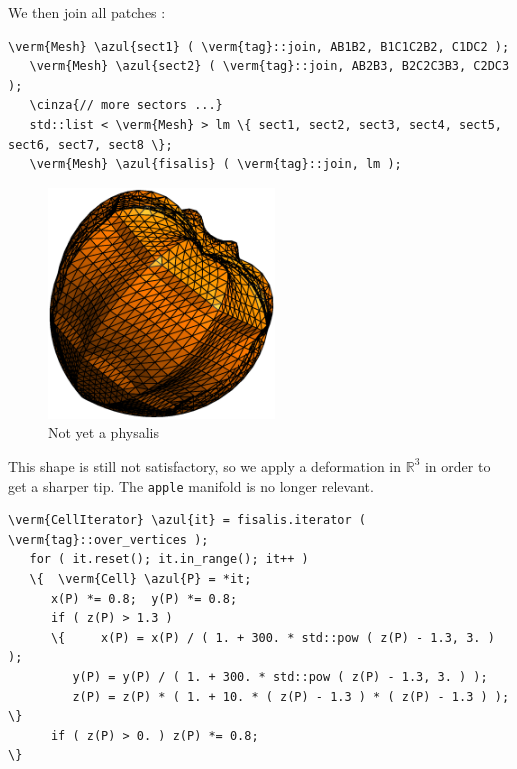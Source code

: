 We then join all patches :
\begin{Verbatim}[commandchars=\\\{\},formatcom=\small\tt,frame=single,
   label=parag-\ref{\numb section 2.\numb parag 10}.cpp,rulecolor=\color{coment},
   baselinestretch=0.94,framesep=2mm]
   \verm{Mesh} \azul{sect1} ( \verm{tag}::join, AB1B2, B1C1C2B2, C1DC2 );
   \verm{Mesh} \azul{sect2} ( \verm{tag}::join, AB2B3, B2C2C3B3, C2DC3 );
   \cinza{// more sectors ...}
   std::list < \verm{Mesh} > lm \{ sect1, sect2, sect3, sect4, sect5, sect6, sect7, sect8 \};
   \verm{Mesh} \azul{fisalis} ( \verm{tag}::join, lm ); 
\end{Verbatim}

\begin{figure}[ht] \centering
  \includegraphics[width=60mm]{fisalis-round}
  \caption{Not yet a physalis}
  \label{\numb section 2.\numb fig 12}
\end{figure}

This shape is still not satisfactory, so we apply a deformation in $ \mathbb{R}^3 $ in order to
get a sharper tip.
The {\small\tt apple} manifold is no longer relevant.

\begin{Verbatim}[commandchars=\\\{\},formatcom=\small\tt,frame=single,
   label=parag-\ref{\numb section 2.\numb parag 10}.cpp,rulecolor=\color{coment},
   baselinestretch=0.94,framesep=2mm]
   \verm{CellIterator} \azul{it} = fisalis.iterator ( \verm{tag}::over_vertices );
   for ( it.reset(); it.in_range(); it++ )
   \{  \verm{Cell} \azul{P} = *it;
      x(P) *= 0.8;  y(P) *= 0.8;
      if ( z(P) > 1.3 )
      \{	 x(P) = x(P) / ( 1. + 300. * std::pow ( z(P) - 1.3, 3. ) );
         y(P) = y(P) / ( 1. + 300. * std::pow ( z(P) - 1.3, 3. ) );
         z(P) = z(P) * ( 1. + 10. * ( z(P) - 1.3 ) * ( z(P) - 1.3 ) );  \}
      if ( z(P) > 0. ) z(P) *= 0.8;                                        \}
\end{Verbatim}


